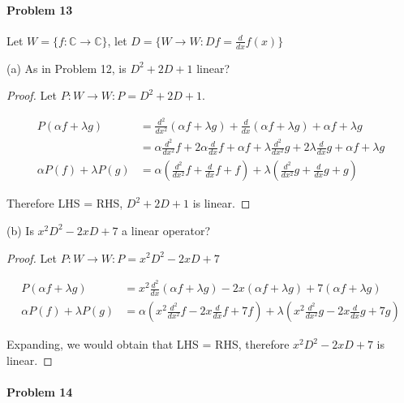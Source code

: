\documentclass{article}
\begin{document}
\paragraph{Problem 13}

Let $W = \{f : \mathbb{C} \to \mathbb{C} \}$, let $D = \{W \to W : Df = \frac{d}{dx} f(x)\}$

(a) As in Problem 12, is $D^2 + 2D + 1$ linear?
\begin{proof}
Let $P : W \to W : P = D^2 + 2D + 1$.

\begin{align*}
P (\alpha f + \lambda g) &= \frac{d^2}{dx^2} (\alpha f + \lambda g) + \frac{d}{dx}  (\alpha f + \lambda g) +  \alpha f + \lambda g
\\ &= \alpha \frac{d^2}{dx^2} f + 2 \alpha \frac{d}{dx} f + \alpha f + \lambda \frac{d^2}{dx^2} g + 2 \lambda \frac{d}{dx} g + \alpha f + \lambda g
\\ \alpha P(f) + \lambda P(g)& = \alpha (\frac{d^2}{dx^2} f + \frac{d}{dx} f + f) + \lambda (\frac{d^2}{dx^2} g + \frac{d}{dx} g + g)
\end{align*}

Therefore LHS = RHS, $D^2 + 2D + 1$ is linear.
\end{proof}

(b) Is $x^2 D^2 - 2xD + 7$ a linear operator?

\begin{proof}

Let $P : W \to W : P = x^2 D^2 - 2xD + 7$

\begin{align*}
P(\alpha f + \lambda g) &= x^2 \frac{d^2}{dx} (\alpha f + \lambda g) - 2x (\alpha f + \lambda g) + 7(\alpha f + \lambda g) \\
\alpha P(f) + \lambda P(g) &= \alpha (x^2 \frac{d^2}{dx^2} f - 2x \frac{d}{dx} f + 7f) + \lambda (x^2 \frac{d^2}{dx^2} g - 2x \frac{d}{dx} g + 7g)
\end{align*}

Expanding, we would obtain that LHS = RHS, therefore $x^2 D^2 - 2xD + 7$ is linear.

\end{proof}

\paragraph{Problem 14}
\end{document}
